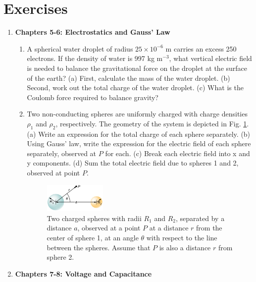 \documentclass[10pt]{article}
\begin{document}
\clearpage

\section{Exercises}

\begin{enumerate}
\item \textbf{Chapters 5-6: Electrostatics and Gauss' Law}
\begin{enumerate}
\item A spherical water droplet of radius $25 \times 10^{-6}$ m carries an excess 250 electrons. If the density of water is 997 kg m$^{-3}$, what vertical electric field is needed to balance the gravitational force on the droplet at the surface of the earth? (a) First, calculate the mass of the water droplet. (b) Second, work out the total charge of the water droplet.  (c) What is the Coulomb force required to balance gravity? \\ \vspace{4cm}
\item Two non-conducting spheres are uniformly charged with charge densities $\rho_1$ and $\rho_2$, respectively.  The geometry of the system is depicted in Fig. \ref{fig:spheres}.  (a) Write an expression for the total charge of each sphere separately.  (b)  Using Gauss' law, write the expression for the electric field of each sphere separately, observed at $P$ for each.  (c) Break each electric field into x and y components.  (d) Sum the total electric field due to spheres 1 and 2, observed at point $P$. \\ \vspace{4cm}
\begin{figure}
\centering
\includegraphics[width=0.3\textwidth]{spheres.png}
\caption{\label{fig:spheres} Two charged spheres with radii $R_1$ and $R_2$, separated by a distance $a$, observed at a point $P$ at a distance $r$ from the center of sphere 1, at an angle $\theta$ with respect to the line between the spheres.  Assume that $P$ is also a distance $r$ from sphere 2.}
\end{figure}
\end{enumerate}
\item \textbf{Chapters 7-8: Voltage and Capacitance}
\begin{enumerate}

\end{enumerate}
\end{enumerate}
\end{document}
